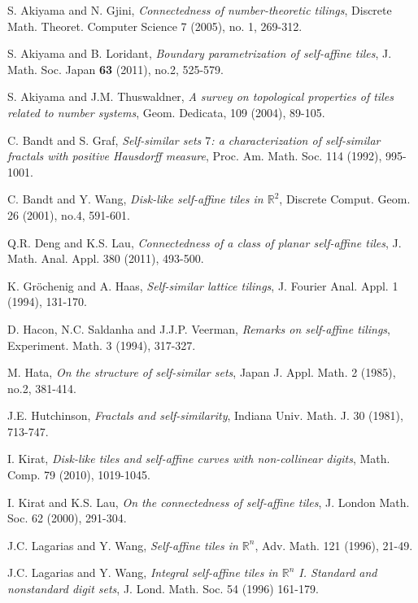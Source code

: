 \documentclass[12pt, reqno]{amsart}
\numberwithin{equation}{section}
\begin{document}
\bigskip

\begin{thebibliography}{99}


  S. Akiyama and  N. Gjini, {\it Connectedness of number-theoretic tilings}, Discrete Math. Theoret. Computer Science 7 (2005), no. 1, 269-312.

  S. Akiyama and  B. Loridant,  {\it Boundary parametrization of self-affine tiles}, J. Math. Soc. Japan {\bf 63} (2011), no.2, 525-579.

 S. Akiyama and J.M. Thuswaldner, {\it A survey on topological properties of tiles related to number systems}, Geom. Dedicata, 109 (2004), 89-105.

  C. Bandt and S. Graf, {\it Self-similar sets $7$: a characterization of self-similar fractals with positive Hausdorff measure}, Proc. Am. Math. Soc. 114 (1992),  995-1001.

  C. Bandt and  Y. Wang, {\it Disk-like self-affine tiles in ${\mathbb{R}}^2$},  Discrete Comput. Geom. 26 (2001), no.4, 591-601.

  Q.R. Deng and K.S. Lau, {\it Connectedness of a class of planar self-affine tiles}, J. Math. Anal. Appl. 380 (2011), 493-500.

  K. Gr\"ochenig and A. Haas, {\it Self-similar lattice tilings}, J. Fourier Anal. Appl. 1 (1994), 131-170.

  D. Hacon, N.C. Saldanha and J.J.P. Veerman, {\it Remarks on self-affine tilings}, Experiment. Math. 3 (1994), 317-327.

  M. Hata, {\it On the structure of self-similar sets}, Japan J. Appl. Math. 2 (1985), no.2, 381-414.

 J.E. Hutchinson, {\it Fractals and self-similarity}, Indiana Univ. Math. J. 30 (1981), 713-747.

  I. Kirat, {\it Disk-like tiles and self-affine curves with non-collinear digits}, Math. Comp. 79 (2010), 1019-1045.

  I. Kirat and  K.S. Lau, {\it On the connectedness of self-affine tiles}, J. London Math. Soc. {62} (2000), 291-304.

  J.C. Lagarias and Y. Wang, {\it Self-affine tiles in ${\mathbb R}^n$}, Adv. Math. 121 (1996), 21-49.

  J.C. Lagarias and Y. Wang,  {\it Integral self-affine tiles in ${\mathbb R}^n$ I. Standard and nonstandard digit sets},  J. Lond. Math. Soc.  54 (1996) 161-179.


\end{thebibliography}
\end{document}
